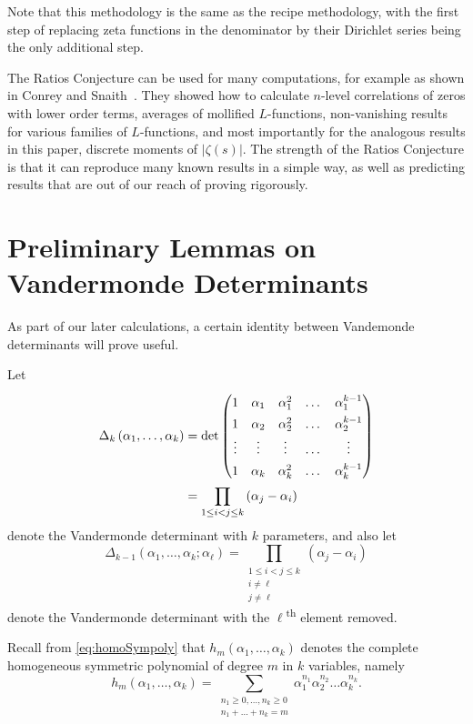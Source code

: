 \documentclass[12pt,a4paper,reqno]{amsart}
\theoremstyle{remark}
\numberwithin{equation}{section}
\begin{document}
Note that this methodology is the same as the recipe methodology, with the first step of replacing zeta functions in the denominator by their Dirichlet series being the only additional step.

The Ratios Conjecture can be used for many computations, for example as shown in Conrey and Snaith~\cite{ConSna07}. They showed how to calculate $n$-level correlations of zeros with lower order terms, averages of mollified $L$-functions, non-vanishing results for various families of $L$-functions, and most importantly for the analogous results in this paper, discrete moments of $|\zeta (s)|$. The strength of the Ratios Conjecture is that it can reproduce many known results in a simple way, as well as predicting results that are out of our reach of proving rigorously.




\section{Preliminary Lemmas on Vandermonde Determinants}\label{Prelim}

As part of our later calculations, a certain identity between Vandemonde determinants will prove useful.

Let
\begin{align*}
\Delta_k\left(\alpha_1,\dots,\alpha_k\right)
&\renewcommand{\arraystretch}{1.4} = \det \begin{pmatrix}
1 & \alpha_1 & \alpha_1^2 & \dots & \alpha_1^{k-1}  \\
1 & \alpha_2 & \alpha_2^2 & \dots & \alpha_2^{k-1}  \\
\vdots & \vdots & \vdots & \dots & \vdots \\
1 & \alpha_{k} & \alpha_{k}^2 & \dots & \alpha_{k}^{k-1}
\end{pmatrix} \\
&= \prod_{1 \leq i < j \leq k} \left(\alpha_j - \alpha_i \right)
\end{align*}
denote the Vandermonde determinant with $k$ parameters, and also let
\[
\Delta_{k-1}\left(\alpha_1,\dots,\alpha_k ; \alpha_\ell\right) = \prod_{\substack{1 \leq i < j \leq k \\ i \neq \ell \\ j \neq \ell}} \left(\alpha_j - \alpha_i \right)
\]
denote the Vandermonde determinant with the $\ell$\textsuperscript{th} element removed.

Recall from \eqref{eq:homoSympoly} that $h_m(\alpha_1,\dots,\alpha_k)$ denotes the complete homogeneous symmetric polynomial of degree $m$ in $k$ variables, namely
\[
h_m(\alpha_1,\dots,\alpha_k) = \sum_{\substack{n_1 \geq 0,\dots,n_k \geq 0 \\ n_1 + \dots + n_k = m}} \alpha_1^{n_1} \alpha_2^{n_2} \dots \alpha_k^{n_{k}}.
\]
\end{document}
